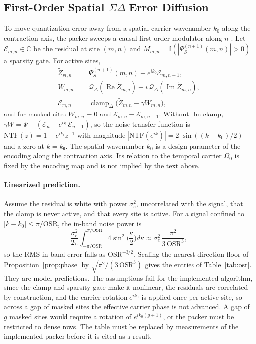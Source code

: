 \documentclass[10pt, twocolumn, a4paper]{article}
\begin{document}
\subsection{First-Order Spatial $\Sigma\Delta$ Error Diffusion}
To move quantization error away from a spatial carrier wavenumber $k_0$ along the contraction axis, the packer sweeps a causal first-order modulator along $n$ \cite{schreier2005}. Let $\mathcal{E}_{m,n}\in\mathbb{C}$ be the residual at site $(m,n)$ and $M_{m,n}=\mathbb{I}(|\Psi_S^{(n+1)}(m,n)|>0)$ a sparsity gate. For active sites,
\begin{equation}
\begin{split}\widetilde{Z}_{m,n}&=\Psi_S^{(n+1)}(m,n)+e^{ik_0}\mathcal{E}_{m,n-1},\\
W_{m,n}&=\mathcal{Q}_{\Delta}(\operatorname{Re}\widetilde{Z}_{m,n})+i\,\mathcal{Q}_{\Delta}(\operatorname{Im}\widetilde{Z}_{m,n}),\\
\mathcal{E}_{m,n}&=\operatorname{clamp}_{\Delta}\big(\widetilde{Z}_{m,n}-\gamma W_{m,n}\big),\end{split}
\end{equation}
and for masked sites $W_{m,n}=0$ and $\mathcal{E}_{m,n}=\mathcal{E}_{m,n-1}$. Without the clamp, $\gamma W=\Psi-(\mathcal{E}_n-e^{ik_0}\mathcal{E}_{n-1})$, so the noise transfer function is $\mathrm{NTF}(z)=1-e^{ik_0}z^{-1}$ with magnitude $|\mathrm{NTF}(e^{ik})|=2|\sin((k-k_0)/2)|$ and a zero at $k=k_0$. The spatial wavenumber $k_0$ is a design parameter of the encoding along the contraction axis. Its relation to the temporal carrier $\Omega_0$ is fixed by the encoding map and is not implied by the text above.

\paragraph{Linearized prediction.} Assume the residual is white with power $\sigma_e^2$, uncorrelated with the signal, that the clamp is never active, and that every site is active. For a signal confined to $|k-k_0|\le\pi/\text{OSR}$, the in-band noise power is
\begin{equation}
\frac{\sigma_e^2}{2\pi}\int_{-\pi/\text{OSR}}^{\pi/\text{OSR}}4\sin^2\!\Big(\frac{\kappa}{2}\Big)d\kappa\approx\sigma_e^2\,\frac{\pi^2}{3\,\text{OSR}^{3}},
\end{equation}
so the RMS in-band error falls as $\text{OSR}^{-3/2}$. Scaling the nearest-direction floor of Proposition~\ref{prop:phase} by $\sqrt{\pi^2/(3\,\text{OSR}^3)}$ gives the entries of Table~\ref{tab:osr}. They are model predictions. The assumptions fail for the implemented algorithm, since the clamp and sparsity gate make it nonlinear, the residuals are correlated by construction, and the carrier rotation $e^{ik_0}$ is applied once per active site, so across a gap of masked sites the effective carrier phase is not advanced. A gap of $g$ masked sites would require a rotation of $e^{ik_0(g+1)}$, or the packer must be restricted to dense rows. The table must be replaced by measurements of the implemented packer before it is cited as a result.
\end{document}
